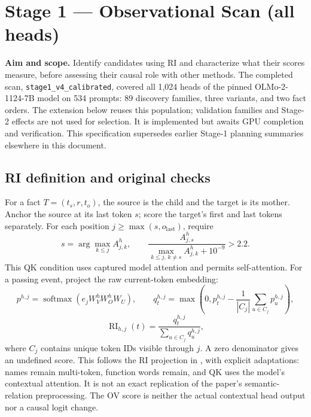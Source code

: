 
\section{Stage 1 --- Observational Scan (all heads)}

\textbf{Aim and scope.} Identify candidates using RI and characterize what their scores measure, before assessing their causal role with other methods. The completed scan, \texttt{stage1\_v4\_calibrated}, covered all 1,024 heads of the pinned OLMo-2-1124-7B model on 534 prompts: 89 discovery families, three variants, and two fact orders. The extension below reuses this population; validation families and Stage-2 effects are not used for selection. It is implemented but awaits GPU completion and verification. This specification supersedes earlier Stage-1 planning summaries elsewhere in this document.

\subsection{RI definition and original checks}

For a fact $T=(t_s,r,t_o)$, the source is the child and the target is its mother. Anchor the source at its last token $s$; score the target's first and last tokens separately. For each position $j\geq\max(s,o_{\mathrm{last}})$, require
\begin{equation}
s=\arg\max_{k\leq j}A^h_{j,k},\qquad
\frac{A^h_{j,s}}{\max_{k\leq j,\,k\neq s}A^h_{j,k}+10^{-9}}>2.2.
\end{equation}
This QK condition uses captured model attention and permits self-attention. For a passing event, project the raw current-token embedding:
\begin{equation}
p^{h,j}=\operatorname{softmax}(e_jW_V^hW_O^hW_U),\qquad
q_t^{h,j}=\max\left(0,p_t^{h,j}-\frac{1}{|C_j|}\sum_{u\in C_j}p_u^{h,j}\right),
\end{equation}
\begin{equation}
\operatorname{RI}_{h,j}(t)=\frac{q_t^{h,j}}{\sum_{u\in C_j}q_u^{h,j}},
\end{equation}
where $C_j$ contains unique token IDs visible through $j$. A zero denominator gives an undefined score. This follows the RI projection in \cite{ren}, with explicit adaptations: names remain multi-token, function words remain, and QK uses the model's contextual attention. It is not an exact replication of the paper's semantic-relation preprocessing. The OV score is neither the actual contextual head output nor a causal logit change.


